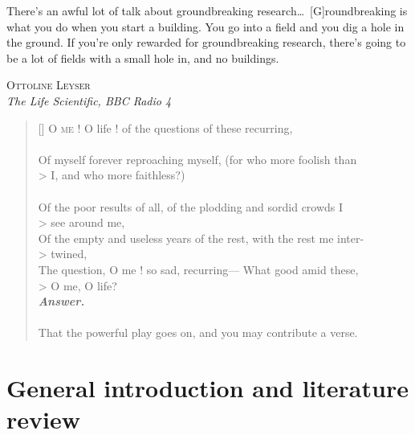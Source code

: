 \documentclass[12pt,a4paper,]{memoir}
\begin{document}
{\begin{vplace}
\setlength{}
\epigraph{There's an awful lot of talk about groundbreaking research\ldots\ [G]roundbreaking is what you do when you start a building. You go into a field and you dig a hole in the ground. If you're only rewarded for groundbreaking research, there's going to be a lot of fields with a small hole in, and no buildings.}{\textsc{Ottoline Leyser}\\ \textit{The Life Scientific, BBC Radio 4}}

\vspace{2\baselineskip}

\settowidth{\versewidth}{Of myself forever reproaching myself, (for who more foolish than)} %
\begin{verse}[\versewidth]
O \textsc{me} ! O life ! of the questions of these recurring, \\
\dotrule{\versewidth} \\
Of myself forever reproaching myself, (for who more foolish than \\> I, and who more faithless?) \\
\dotrule{\versewidth} \\
Of the poor results of all, of the plodding and sordid crowds I \\> see around me, \\
Of the empty and useless years of the rest, with the rest me inter- \\> twined, \\
The question, O me ! so sad, recurring--- What good amid these, \\> O me, O life? \\
 \textbf{\textit{\footnotesize Answer.}} \\
\dotrule{\versewidth} \\
That the powerful play goes on, and you may contribute a verse.\\
\end{verse}

\end{vplace}

} %
\clearpage

{
\hypersetup{linkcolor=black}
\setcounter{tocdepth}{1}
\tableofcontents
}
\hypertarget{part-intro}{%
\part{General introduction and literature review}\label{part-intro}}
\end{document}
